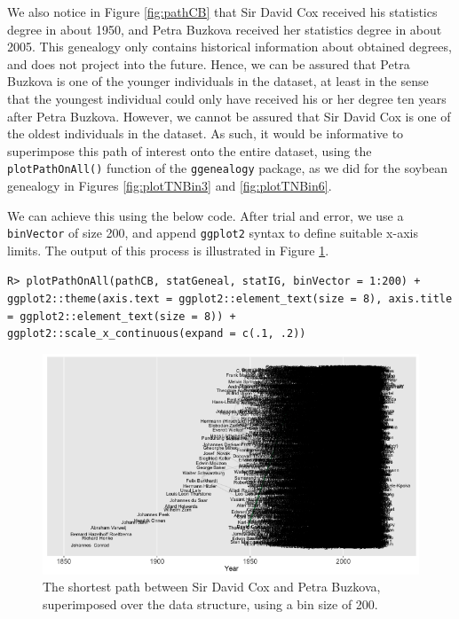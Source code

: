 \documentclass[11pt,a4paper,oldfontcommands,openany]{memoir}
\DeclareRobustCommand{\mybox}[2][gray!15]{%
\begin{tcolorbox}[   %
        breakable,
        left=0pt,
        right=0pt,
        top=0pt,
        bottom=0pt,
        colback=#1,
        colframe=#1,
        width=\dimexpr\textwidth\relax, 
        enlarge left by=0mm,
        boxsep=5pt,
        arc=0pt,outer arc=0pt,
        ]
        #2
\end{tcolorbox}
}
\numberwithin{equation}{section} %
\newcommand{\code}[1]{{\texttt{#1}}}
\newcommand{\pkg}[1]{{\texttt{#1}}}
\begin{document}
We also notice in Figure \ref{fig:pathCB} that Sir David Cox received his statistics degree in about 1950, and Petra Buzkova received her statistics degree in about 2005. This genealogy only contains historical information about obtained degrees, and does not project into the future. Hence, we can be assured that Petra Buzkova is one of the younger individuals in the dataset, at least in the sense that the youngest individual could only have received his or her degree ten years after Petra Buzkova. However, we cannot be assured that Sir David Cox is one of the oldest individuals in the dataset. As such, it would be informative to superimpose this path of interest onto the entire dataset, using the \code{plotPathOnAll()} function of the \pkg{ggenealogy} package, as we did for the soybean genealogy in Figures \ref{fig:plotTNBin3} and \ref{fig:plotTNBin6}.

We can achieve this using the below code. After trial and error, we use a \code{binVector} of size 200, and append \pkg{ggplot2} syntax to define suitable x-axis limits. The output of this process is illustrated in Figure \ref{fig:plotCBText}.

\mybox{
\texttt{R> plotPathOnAll(pathCB, statGeneal, statIG, binVector = 1:200) + ggplot2::theme(axis.text = ggplot2::element\_text(size = 8), axis.title = ggplot2::element\_text(size = 8)) + ggplot2::scale\_x\_continuous(expand = c(.1, .2))}
}

\begin{figure}[H]
    \centering
    \includegraphics[width=\textwidth]{plotCBText}
    \caption{The shortest path between Sir David Cox and Petra Buzkova, superimposed over the data structure, using a bin size of 200.}
    \label{fig:plotCBText}
\end{figure}
\end{document}
